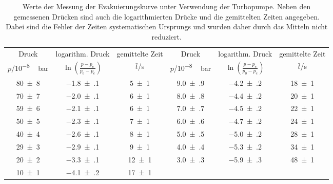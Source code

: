 \begin{table}[!h]
	\centering
	\begin{adjustbox}{width=\textwidth}
	\begin{tabular}{cccccc}
		\toprule
		Druck & logarithm. Druck & gemittelte Zeit & Druck & logarithm. Druck & gemittelte Zeit\\
		$p$/\si{10^{-8}\,bar} & $\ln(\frac{p-p_e}{p_0-p_e})$ & $\bar{t}$/\si{s} & $p$/\si{10^{-8}\,bar} & $\ln(\frac{p-p_e}{p_0-p_e})$ & $\bar{t}$/\si{s}\\
\midrule
		\num{80(8)} & \num{-1.8(1)} & \num{5(1)} & \num{9.0(9)} & \num{-4.2(2)} & \num{18(1)}\\
		\num{70(7)} & \num{-2.0(1)} & \num{6(1)} & \num{8.0(8)} & \num{-4.4(2)} & \num{20(1)}\\
		\num{59(6)} & \num{-2.1(1)} & \num{6(1)} & \num{7.0(7)} & \num{-4.5(2)} & \num{22(1)}\\
		\num{50(5)} & \num{-2.3(1)} & \num{7(1)} & \num{6.0(6)} & \num{-4.7(2)} & \num{24(1)}\\
		\num{40(4)} & \num{-2.6(1)} & \num{8(1)} & \num{5.0(5)} & \num{-5.0(2)} & \num{28(1)}\\
		\num{29(3)} & \num{-2.9(1)} & \num{9(1)} & \num{4.0(4)} & \num{-5.3(2)} & \num{34(1)}\\
		\num{20(2)} & \num{-3.3(1)} & \num{12(1)} & \num{3.0(3)} & \num{-5.9(3)} & \num{48(1)}\\
		\num{10(1)} & \num{-4.1(2)} & \num{17(1)}\\
		\bottomrule
	\end{tabular}
\end{adjustbox}
	\caption{Werte der Messung der Evakuierungskurve unter Verwendung der Turbopumpe.
                        Neben den gemessenen Drücken sind auch die logarithmierten Drücke und die gemittelten
                        Zeiten angegeben. Dabei sind die Fehler der Zeiten systematischen Ursprungs und wurden 
                        daher durch das Mitteln nicht reduziert. \label{tab:Evakuierungskurve_Turbo}}
\end{table}
